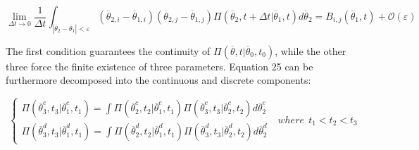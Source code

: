 \begin{equation}
\label{eq:chapKolmogAssump4}
\lim_{\Delta t \to 0} \frac{1}{\Delta t}  \int_{|
\overline{\theta}_{2}-\overline{\theta}_{1}|<\varepsilon }
\left ( \overline{\theta}_{2,i} - \overline{\theta}_{1,i} \right ) \left (
\overline{\theta}_{2,j} - \overline{\theta}_{1,j} \right )
\Pi \left (\overline{\theta}_{2},t+\Delta t|\overline{\theta}_{1},t  \right )
d\overline{\theta}_{2} = B_{i,j}\left ( \overline{\theta}_{1},t \right ) +
\mathcal{O}\left ( \varepsilon \right )
\end{equation}

The first condition guarantees the continuity of $\Pi \left (\overline{\theta},t|\overline{\theta}_{0},t_{0}  \right )$, while the other three force the finite existence of three parameters.
Equation 25 can be furthermore decomposed into the continuous and discrete components:

\begin{equation}
\label{eq:chapKolmogIntegralFormContDisct}
\left\{\begin{matrix}
\Pi \left (\overline{\theta}_{3}^{c},t_{3}|\overline{\theta}_{1}^{c},t_{1}  \right )
= \int \Pi \left (\overline{\theta}_{2}^{c},t_{2}|\overline{\theta}_{1}^{c},t_{1}
\right ) \Pi \left (\overline{\theta}_{3}^{c},t_{3}|\overline{\theta}_{2}^{c},t_{2}
\right ) d\overline{\theta}_{2}^{c}
\\
\Pi \left (\overline{\theta}_{3}^{d},t_{3}|\overline{\theta}_{1}^{d},t_{1}  \right )
= \int \Pi \left (\overline{\theta}_{2}^{d},t_{2}|\overline{\theta}_{1}^{d},t_{1}
\right ) \Pi \left (\overline{\theta}_{3}^{d},t_{3}|\overline{\theta}_{2}^{d},t_{2}
\right ) d\overline{\theta}_{2}^{d}
\end{matrix}\right.
\: \: \: where \:\:   t_{1}<t_{2}<t_{3}
\end{equation}

